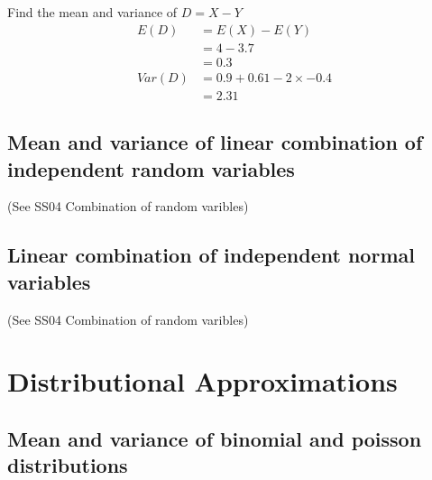 \begin{example}
            \begin{step}{Find the mean and variance of $D = X - Y$}
                \begin{align*}
                    E(D)    &= E(X) - E(Y)                  \\
                            &= 4 - 3.7                      \\
                            &= 0.3                          \\
                    Var(D)  &= 0.9 + 0.61 - 2 \times -0.4   \\
                            &= 2.31
                \end{align*}
            \end{step}

        \end{example}

        \subsection{Mean and variance of linear combination of independent random variables}
            (See SS04 Combination of random varibles)

        \subsection{Linear combination of independent normal variables}
            (See SS04 Combination of random varibles)

    \section{Distributional Approximations}
        \subsection{Mean and variance of binomial and poisson distributions}
